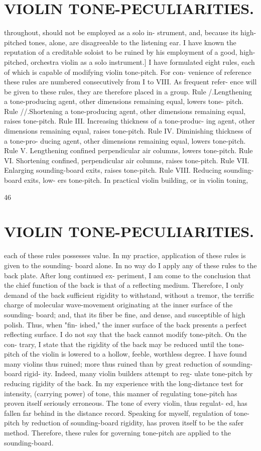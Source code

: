 \documentclass{article}
\begin{document}
\section*{VIOLIN TONE-PECULIARITIES.}
throughout, should not be employed as a solo in- strument, and, because its high-pitched tones, alone, are disagreeable to the listening ear. I have known the reputation of a creditable soloist to be ruined by his employment of a good, high-pitched, orchestra violin as a solo instrument.] I have formulated eight rules, each of which is capable of modifying violin tone-pitch. For con- venience of reference these rules are numbered consecutively from I to VIII. As frequent refer- ence will be given to these rules, they are therefore placed in a group. Rule /.Lengthening a tone-producing agent, other dimensions remaining equal, lowers tone- pitch. Rule //.Shortening a tone-producing agent, other dimensions remaining equal, raises tone-pitch. Rule III. Increasing thickness of a tone-produc- ing agent, other dimensions remaining equal, raises tone-pitch. Rule IV. Diminishing thickness of a tone-pro- ducing agent, other dimensions remaining equal, lowers tone-pitch. Rule V. Lengthening confined perpendicular air columns, lowers tone-pitch. Rule VI. Shortening confined, perpendicular air columns, raises tone-pitch. Rule VII. Enlarging sounding-board exits, raises tone-pitch. Rule VIII. Reducing sounding-board exits, low- ers tone-pitch. In practical violin building, or in violin toning,

46

\section*{VIOLIN TONE-PECULIARITIES.}
each of these rules possesses value. In my practice, application of these rules is given to the sounding- board alone. In no way do I apply any of these rules to the back plate. After long continued ex- periment, I am come to the conclusion that the chief function of the back is that of a reflecting medium. Therefore, I only demand of the back sufficient rigidity to withstand, without a tremor, the terrific charge of molecular wave-movement originating at the inner surface of the sounding- board; and, that its fiber be fine, and dense, and susceptible of high polish. Thus, when "fin- ished," the inner surface of the back presents a perfect reflecting surface. I do not say that the back cannot modify tone-pitch. On the con- trary, I state that the rigidity of the back may be reduced until the tone-pitch of the violin is lowered to a hollow, feeble, worthless degree. I have found many violins thus ruined; more thus ruined than by great reduction of sounding-board rigid- ity. Indeed, many violin builders attempt to reg- ulate tone-pitch by reducing rigidity of the back. In my experience with the long-distance test for intensity, (carrying power) of tone, this manner of regulating tone-pitch has proven itself seriously erroneous. The tone of every violin, thus regulat- ed, has fallen far behind in the distance record. Speaking for myself, regulation of tone-pitch by reduction of sounding-board rigidity, has proven itself to be the safer method. Therefore, these rules for governing tone-pitch are applied to the sounding-board.
\end{document}
